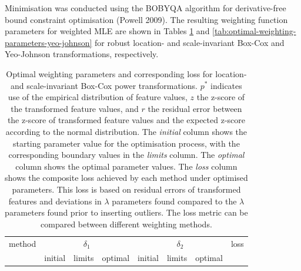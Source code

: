 \documentclass[
  a4paper,
]{article}
\begin{document}
Minimisation was conducted using the BOBYQA algorithm for
derivative-free bound constraint optimisation (Powell 2009). The
resulting weighting function parameters for weighted MLE are shown in
Tables \ref{tab:optimal-weighting-parameters-box-cox} and
\ref{tab:optimal-weighting-parameters-yeo-johnson} for robust location-
and scale-invariant Box-Cox and Yeo-Johnson transformations,
respectively.

\begin{table}
\begin{center}
\caption{Optimal weighting parameters and corresponding loss for location- and scale-invariant Box-Cox power transformations.
$p^{*}$ indicates use of the empirical distribution of feature values, $z$ the z-score of the transformed feature values,
and $r$ the residual error between the z-score of transformed feature values and the expected z-score according to the normal distribution.
The \textit{initial} column shows the starting parameter value for the optimisation process, with the corresponding boundary values in the \textit{limits} column. 
The \textit{optimal} column shows the optimal parameter values.
The \textit{loss} column shows the composite loss achieved by each method under optimised parameters.
This loss is based on residual errors of transformed features and deviations in $\lambda$ parameters
found compared to the $\lambda$ parameters found prior to inserting outliers.
The loss metric can be compared between different weighting methods.
}
\label{tab:optimal-weighting-parameters-box-cox}
\begin{tabular}{l r r r r r r r}

\toprule
method & \multicolumn{3}{c}{$\delta_1$} & \multicolumn{3}{c}{$\delta_2$} & loss \\
& initial & limits & optimal & initial & limits & optimal & \\


\end{tabular}
\end{center}
\end{table}
\end{document}
